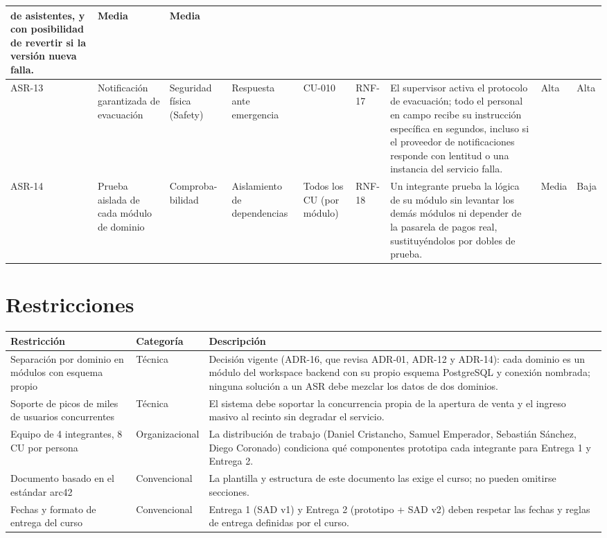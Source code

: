 \documentclass[11pt,a4paper]{article}
\begin{document}
\begin{landscape}
\begin{center}
\begin{longtable}{|p{1cm}|p{2.9cm}|p{2.1cm}|p{2.3cm}|p{1.7cm}|p{1.5cm}|p{6.1cm}|p{1.4cm}|p{1.4cm}|}
de asistentes, y con posibilidad de revertir si la versión nueva falla. & Media & Media\\
\hline
ASR-13 & Notificación garantizada de evacuación & Seguridad física (Safety) & Respuesta ante
emergencia & CU-010 & RNF-17 & El supervisor activa el protocolo de evacuación; todo el personal
en campo recibe su instrucción específica en segundos, incluso si el proveedor de notificaciones
responde con lentitud o una instancia del servicio falla. & Alta & Alta\\
\hline
ASR-14 & Prueba aislada de cada módulo de dominio & Comproba-bilidad & Aislamiento de dependencias &
Todos los CU (por módulo) & RNF-18 & Un integrante prueba la lógica de su módulo sin
levantar los demás módulos ni depender de la pasarela de pagos real, sustituyéndolos
por dobles de prueba. & Media & Baja\\
\end{longtable}
\end{center}
\end{landscape}

\section{Restricciones}
\label{sec:restricciones}

\begin{center}
\begin{longtable}{|p{3.2cm}|p{2.8cm}|p{7cm}|}
\hline
\textbf{Restricción} & \textbf{Categoría} & \textbf{Descripción} \\
\hline
\endhead
Separación por dominio en módulos con esquema propio & Técnica & Decisión vigente (ADR-16, que
revisa ADR-01, ADR-12 y ADR-14): cada dominio es un módulo del workspace backend con su propio
esquema PostgreSQL y conexión nombrada; ninguna solución a un ASR debe mezclar los datos de dos
dominios.\\
\hline
Soporte de picos de miles de usuarios concurrentes & Técnica & El sistema debe soportar la
concurrencia propia de la apertura de venta y el ingreso masivo al recinto sin degradar el
servicio.\\
\hline
Equipo de 4 integrantes, 8 CU por persona & Organizacional & La distribución de trabajo (Daniel
Cristancho, Samuel Emperador, Sebastián Sánchez, Diego Coronado) condiciona qué componentes
prototipa cada integrante para Entrega 1 y Entrega 2.\\
\hline
Documento basado en el estándar arc42 & Convencional & La plantilla y estructura de este
documento las exige el curso; no pueden omitirse secciones.\\
\hline
Fechas y formato de entrega del curso & Convencional & Entrega 1 (SAD v1) y Entrega 2 (prototipo +
SAD v2) deben respetar las fechas y reglas de entrega definidas por el curso.\\
\hline
\end{longtable}
\end{center}
\end{document}
